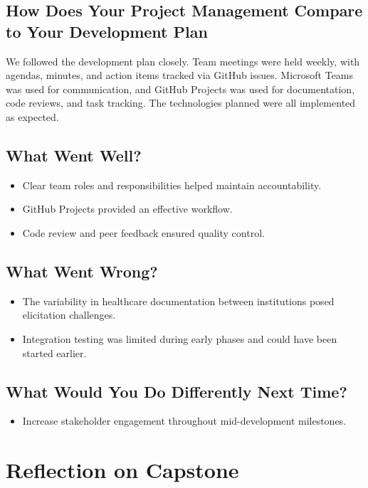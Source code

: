 \documentclass{article}
\begin{document}
 \subsection{How Does Your Project Management Compare to Your Development Plan}
 
 We followed the development plan closely. Team meetings were held weekly, with agendas, minutes, and action items tracked via GitHub issues. Microsoft Teams was used for communication, and GitHub Projects was used for documentation, code reviews, and task tracking. The technologies planned were all implemented as expected.
 
 \subsection{What Went Well?}
 
 \begin{itemize}
     \item Clear team roles and responsibilities helped maintain accountability.
     \item GitHub Projects provided an effective workflow.
     \item Code review and peer feedback ensured quality control.
 \end{itemize}
 
 \subsection{What Went Wrong?}
 
 \begin{itemize}
     \item The variability in healthcare documentation between institutions posed elicitation challenges.
     \item Integration testing was limited during early phases and could have been started earlier.
 \end{itemize}
 
 \subsection{What Would You Do Differently Next Time?}
 
 \begin{itemize}
     \item Increase stakeholder engagement throughout mid-development milestones.
 \end{itemize}
 
 \section{Reflection on Capstone}
 
\end{document}

